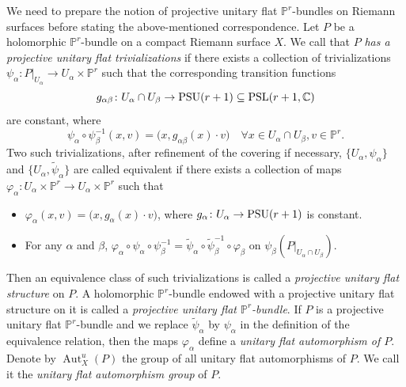 \documentclass[12pt]{article}
\begin{document}
We need to prepare the notion of projective unitary flat $\mathbb P^{r}$-bundles on Riemann surfaces before stating the above-mentioned correspondence. Let $P$ be a holomorphic $\mathbb P^{r}$-bundle on a compact Riemann surface $X$. We call that $P$ {\it has a projective unitary flat trivializations} if there exists a collection of trivializations $\psi_{\alpha}\colon P|_{U_{\alpha}} \rightarrow U_{\alpha} \times \mathbb{P}^r$ such that the corresponding transition functions
\[ g_{\alpha\beta} \colon U_{\alpha} \cap U_{\beta} \rightarrow {\rm PSU}(r+1) \subseteq  {\rm PSL}(r+1, \mathbb C) \]
are constant, where
\[ \psi_{\alpha} \circ \psi_{\beta}^{-1}(x, v) = \big(x, g_{\alpha\beta}(x) \cdot v \big) \quad \forall x \in U_{\alpha} \cap U_{\beta}, v\in \mathbb{P}^{r}. \]
Two such trivializations, after refinement of the covering if necessary, $\{U_{\alpha}, \psi_{\alpha}\}$ and $\{U_{\alpha}, \tilde{\psi}_{\alpha} \}$ are called equivalent if there exists a collection of maps $\varphi_{\alpha}\colon U_{\alpha} \times \mathbb{P}^r \rightarrow U_{\alpha} \times \mathbb{P}^r$ such that
\begin{itemize}
  \item $\varphi_{\alpha}(x, v)=\big( x, g_{\alpha}(x) \cdot v \big)$, where $g_{\alpha}\colon U_{\alpha} \rightarrow {\rm PSU}(r+1)$ is constant.
  \item For any $\alpha$ and $\beta$, $\varphi_{\alpha} \circ \psi_{\alpha} \circ \psi_{\beta} ^{-1} = \tilde{\psi}_{\alpha} \circ \tilde{\psi}_{\beta} ^{-1}\circ \varphi_{\beta}$ on $\psi_{\beta}(P|_{U_{\alpha} \cap U_{\beta}})$.
\end{itemize}
Then an equivalence class of such trivializations is called a {\it projective unitary flat structure} on $P$. A holomorphic $\mathbb P^{r}$-bundle endowed with a projective unitary flat structure on it is called a {\it projective unitary flat $\mathbb P^{r}$-bundle}. If $P$ is a projective unitary flat $\mathbb P^{r}$-bundle and we replace $\tilde{\psi}_{\alpha}$ by $\psi_{\alpha}$ in the definition of the equivalence relation, then the maps $\varphi_{\alpha}$ define a {\it unitary flat automorphism of $P$}. Denote by $\operatorname{Aut}_{X}^{u}(P)$ the group of all unitary flat automorphisms of $P$. We call it the {\it unitary flat automorphism group} of $P$.
\end{document}
